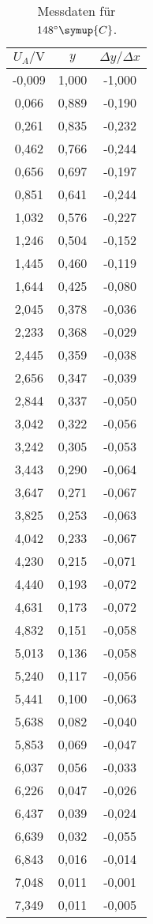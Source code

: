\begin{longtable}{c c c}
	\caption{Messdaten für $148^\circ \symup{C}$.}
	\label{tab:148}\\
	\hline
	$U_A / \si{\volt}$ & $y$  & $\Delta y / \Delta x$ \\
	\hline
	-0,009&1,000&-1,000 \\
	0,066&0,889&-0,190 \\
	0,261&0,835&-0,232 \\
	0,462&0,766&-0,244 \\
	0,656&0,697&-0,197 \\
	0,851&0,641&-0,244 \\
	1,032&0,576&-0,227 \\
	1,246&0,504&-0,152 \\
	1,445&0,460&-0,119 \\
	1,644&0,425&-0,080 \\
	2,045&0,378&-0,036 \\
	2,233&0,368&-0,029 \\
	2,445&0,359&-0,038 \\
	2,656&0,347&-0,039 \\
	2,844&0,337&-0,050 \\
	3,042&0,322&-0,056 \\
	3,242&0,305&-0,053 \\
	3,443&0,290&-0,064 \\
	3,647&0,271&-0,067 \\
	3,825&0,253&-0,063 \\
	4,042&0,233&-0,067 \\
	4,230&0,215&-0,071 \\
	4,440&0,193&-0,072 \\
	4,631&0,173&-0,072 \\
	4,832&0,151&-0,058 \\
	5,013&0,136&-0,058 \\
	5,240&0,117&-0,056 \\
	5,441&0,100&-0,063 \\
	5,638&0,082&-0,040 \\
	5,853&0,069&-0,047 \\
	6,037&0,056&-0,033 \\
	6,226&0,047&-0,026 \\
	6,437&0,039&-0,024 \\
	6,639&0,032&-0,055 \\
	6,843&0,016&-0,014 \\
	7,048&0,011&-0,001 \\
	7,349&0,011&-0,005 \\

\end{longtable}

